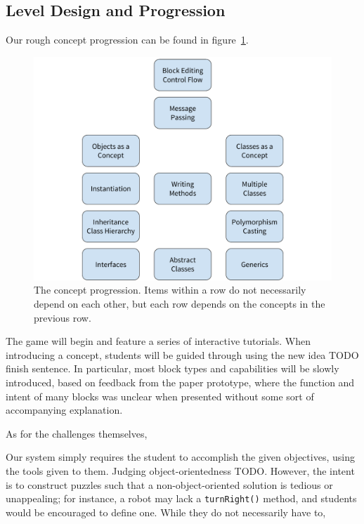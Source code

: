 \documentclass[12pt,notitlepage]{article}
\begin{document}
\subsection{Level Design and Progression}

Our rough concept progression can be found in figure~\ref{fig:progression}.

\begin{figure}[h]
  \centering
  \includegraphics[width=\textwidth]{concept_progression.pdf}
  \caption{The concept progression. Items within a row do not
    necessarily depend on each other, but each row depends on the
    concepts in the previous row.}\label{fig:progression}
\end{figure}

The game will begin and feature a series of interactive
tutorials. When introducing a concept, students will be guided through
using the new idea TODO finish sentence. In particular, most block
types and capabilities will be slowly introduced, based on feedback
from the paper prototype, where the function and intent of many blocks
was unclear when presented without some sort of accompanying
explanation.


As for the challenges themselves,

Our system simply requires the student to accomplish the given
objectives, using the tools given to them. Judging object-orientedness
TODO. However, the intent is to construct puzzles such that a
non-object-oriented solution is tedious or unappealing; for instance,
a robot may lack a \texttt{turnRight()} method, and students would be
encouraged to define one. While they do not necessarily have to,
\end{document}
